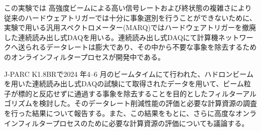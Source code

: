 \documentclass[12pt,a4paper,upLaTeX]{jsarticle}
\begin{document}
この実験では
高強度ビームによる高い信号レートおよび終状態の複雑さにより従来のハードウェアトリガーでは十分に事象選別を行うことができないために、
実験で用いる汎用スペクトロメーター(MARQ)ではハードウェアトリガーを撤廃した連続読み出し式DAQを用いる。連続読み出し式DAQにて計算機ネットワークへ送られるデータレートは膨大であり、その中から不要な事象を除去するためのオンラインフィルタープロセスが開発中である。

J-PARC K1.8BRで2024 年4--6 月のビームタイムにて行われた、ハドロンビームを用いた連続読み出し式DAQの試験にて取得されたデータを用いて、ビーム粒子が標的と反応せずに通過する事象を除去することを目的としたフィルターアルゴリズムを検討した。そのデータレート削減性能の評価と必要な計算資源の調査を行った結果について報告する。また、この結果をもとに、さらに高度なオンラインフィルタープロセスのために必要な計算資源の評価についても議論する。

\end{document}
